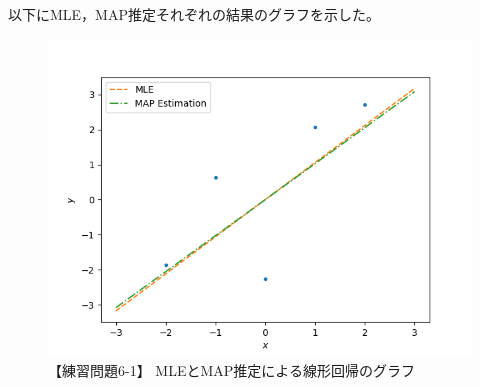\documentclass[class=jsarticle, crop=false, dvipdfmx, fleqn]{standalone}
\begin{document}
以下にMLE，MAP推定それぞれの結果のグラフを示した。

\begin{figure}[H]
\centering
\includegraphics[clip, width=12cm]{../figures/q_6_1}
\caption{【練習問題6-1】 MLEとMAP推定による線形回帰のグラフ}
\label{fig:q6-1_MLE_MAP_graph}
\end{figure}
\end{document}
